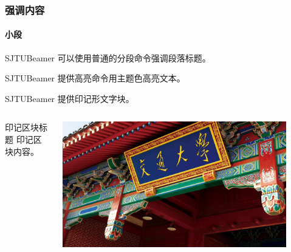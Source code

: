 \documentclass[
    aspectratio=169,  %
]{ctexbeamer}
\begin{document}
\begin{frame}
  \frametitle{强调内容}

  \paragraph{小段} SJTUBeamer 可以使用普通的分段命令强调段落标题。

   SJTUBeamer 提供高亮命令用主题色高亮文本。

   SJTUBeamer 提供印记形文字块。

  \stamphrule

  \begin{columns}
    \begin{column}{0.6\textwidth}
      \begin{stampblock}{印记区块标题}
        印记区块内容。
      \end{stampblock}
    \end{column}
    \begin{column}{0.3\textwidth}
      \begin{stampbox}
        \includegraphics[width=0.9\textwidth]{vi/sjtuphoto.jpg}
      \end{stampbox}
    \end{column}
  \end{columns}

\end{frame}
\end{document}
